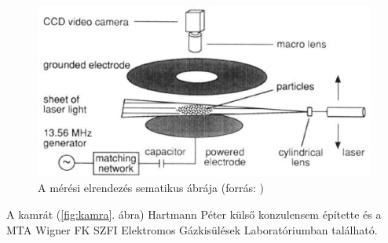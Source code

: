 	\begin{figure}[H]
		\centering
		\includegraphics[width=0.9\columnwidth]{figures/eps/dust_camera.eps}
		\caption[A mérési elrendezés sematikus ábrája]{A mérési elrendezés sematikus ábrája (forrás: \cite{Merlino2006})} 
		\label{fig:meresch}
	\end{figure}
	
	A kamrát (\ref{fig:kamra}. ábra) Hartmann Péter külső konzulensem építette és a MTA Wigner FK SZFI
	Elektromos Gázkisülések Laboratóriumban található.
	
